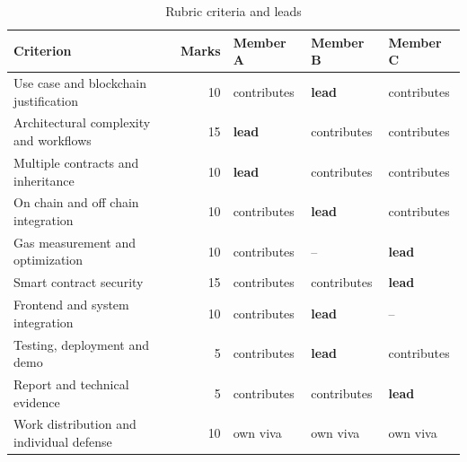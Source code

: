 \begin{table}[H]
\centering\small
\caption{Rubric criteria and leads}
\label{tab:rubric}
\begin{tabular}{@{}lrlll@{}}
\toprule
Criterion & Marks & Member A & Member B & Member C \\
\midrule
Use case and blockchain justification & 10 & contributes & \textbf{lead} & contributes \\
Architectural complexity and workflows & 15 & \textbf{lead} & contributes & contributes \\
Multiple contracts and inheritance & 10 & \textbf{lead} & contributes & contributes \\
On chain and off chain integration & 10 & contributes & \textbf{lead} & contributes \\
Gas measurement and optimization & 10 & contributes & -- & \textbf{lead} \\
Smart contract security & 15 & contributes & contributes & \textbf{lead} \\
Frontend and system integration & 10 & contributes & \textbf{lead} & -- \\
Testing, deployment and demo & 5 & contributes & \textbf{lead} & contributes \\
Report and technical evidence & 5 & contributes & contributes & \textbf{lead} \\
Work distribution and individual defense & 10 & own viva & own viva & own viva \\
\bottomrule
\end{tabular}
\end{table}
